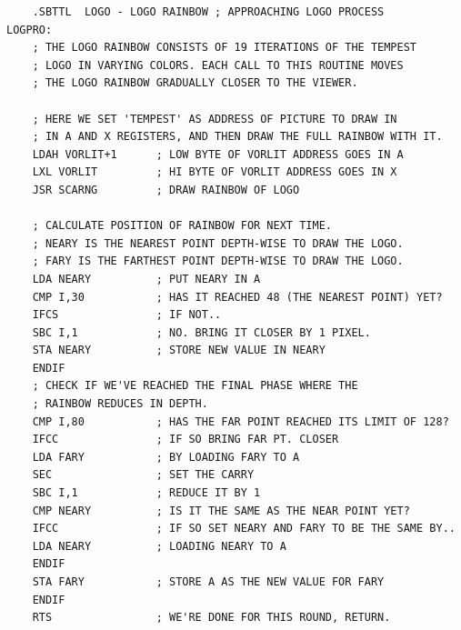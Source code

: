\begin{lstlisting}
    .SBTTL  LOGO - LOGO RAINBOW ; APPROACHING LOGO PROCESS
LOGPRO: 
    ; THE LOGO RAINBOW CONSISTS OF 19 ITERATIONS OF THE TEMPEST
    ; LOGO IN VARYING COLORS. EACH CALL TO THIS ROUTINE MOVES
    ; THE LOGO RAINBOW GRADUALLY CLOSER TO THE VIEWER.

    ; HERE WE SET 'TEMPEST' AS ADDRESS OF PICTURE TO DRAW IN 
    ; IN A AND X REGISTERS, AND THEN DRAW THE FULL RAINBOW WITH IT.
    LDAH VORLIT+1      ; LOW BYTE OF VORLIT ADDRESS GOES IN A
    LXL VORLIT         ; HI BYTE OF VORLIT ADDRESS GOES IN X
    JSR SCARNG         ; DRAW RAINBOW OF LOGO

    ; CALCULATE POSITION OF RAINBOW FOR NEXT TIME.
    ; NEARY IS THE NEAREST POINT DEPTH-WISE TO DRAW THE LOGO.
    ; FARY IS THE FARTHEST POINT DEPTH-WISE TO DRAW THE LOGO.
    LDA NEARY          ; PUT NEARY IN A
    CMP I,30           ; HAS IT REACHED 48 (THE NEAREST POINT) YET?
    IFCS               ; IF NOT..
    SBC I,1            ; NO. BRING IT CLOSER BY 1 PIXEL.
    STA NEARY          ; STORE NEW VALUE IN NEARY
    ENDIF
    ; CHECK IF WE'VE REACHED THE FINAL PHASE WHERE THE
    ; RAINBOW REDUCES IN DEPTH.
    CMP I,80           ; HAS THE FAR POINT REACHED ITS LIMIT OF 128?
    IFCC               ; IF SO BRING FAR PT. CLOSER
    LDA FARY           ; BY LOADING FARY TO A
    SEC                ; SET THE CARRY
    SBC I,1            ; REDUCE IT BY 1
    CMP NEARY          ; IS IT THE SAME AS THE NEAR POINT YET?
    IFCC               ; IF SO SET NEARY AND FARY TO BE THE SAME BY..
    LDA NEARY          ; LOADING NEARY TO A
    ENDIF
    STA FARY           ; STORE A AS THE NEW VALUE FOR FARY
    ENDIF
    RTS                ; WE'RE DONE FOR THIS ROUND, RETURN.
\end{lstlisting}

